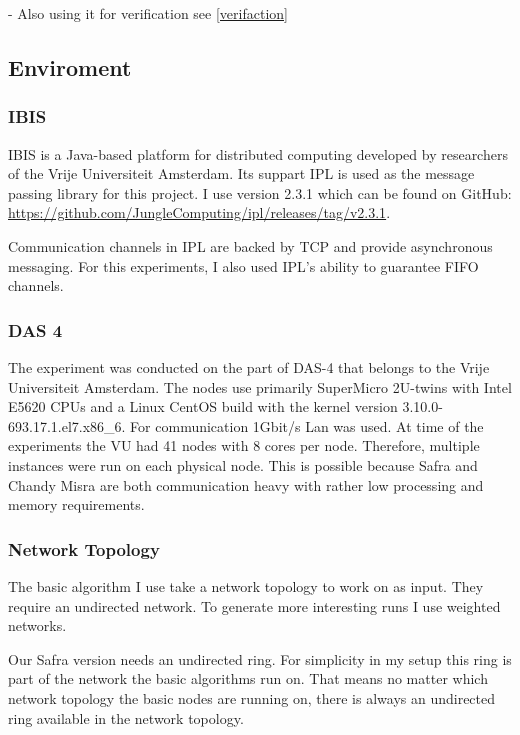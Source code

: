   - Also using it for verification  see \cref{verifaction}
		
    

  

\subsection{Enviroment}
\subsubsection{IBIS}
  IBIS is a Java-based platform for distributed computing developed by researchers of the Vrije Universiteit Amsterdam. 
  Its suppart IPL is used as the message passing library for this project. 
  I use version 2.3.1 which can be found on GitHub: \href{https://github.com/JungleComputing/ipl/releases/tag/v2.3.1}{https://github.com/JungleComputing/ipl/releases/tag/v2.3.1}.
  
  Communication channels in IPL are backed by TCP and provide asynchronous messaging.
  For this experiments, I also used IPL's ability to guarantee FIFO channels.
\subsubsection{DAS 4}
  The experiment was conducted on the part of DAS-4 that belongs to the Vrije Universiteit Amsterdam. 
  The nodes use primarily SuperMicro 2U-twins with Intel E5620 CPUs and a Linux CentOS build with the kernel version 3.10.0-693.17.1.el7.x86\_6.
  For communication 1Gbit/s Lan was used.
  At time of the experiments the VU had 41 nodes with 8 cores per node.
  Therefore, multiple instances were run on each physical node.
  This is possible because Safra and Chandy Misra are both communication heavy with rather low processing and memory requirements.
 
\subsubsection{Network Topology}
  The basic algorithm I use take a network topology to work on as input. 
  They require an undirected network.
  To generate more interesting runs I use weighted networks.
  
  Our Safra version needs an undirected ring. 
  For simplicity in my setup this ring is part of the network the basic algorithms run on. 
  That means no matter which network topology the basic nodes are running on, there is always an undirected ring available in the network topology.
  
